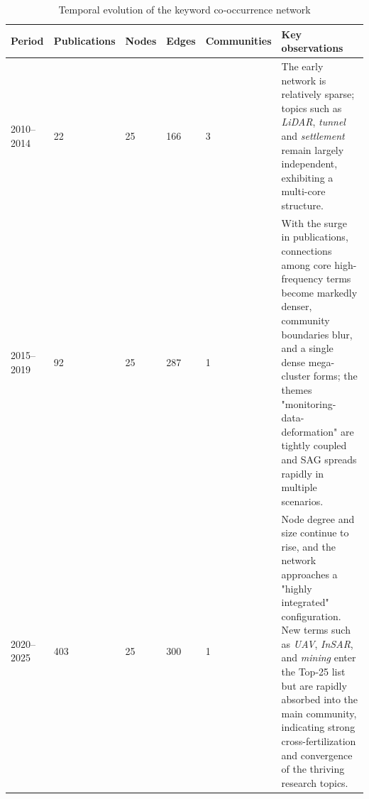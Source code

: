 \documentclass[preprint,11pt,authoryear,3p]{elsarticle}
\begin{document}
\begin{table}[htbp]
    \centering
    \caption{Temporal evolution of the keyword co‐occurrence network}
    \label{tab:Co_Nx}
    \begin{tabular}{p{4em}p{5em}p{4em}p{4em}p{4em}p{18em}}
        \toprule
        \textbf{Period} & \textbf{Publications} & \textbf{Nodes} & \textbf{Edges} & \textbf{Communities} & \textbf{Key observations} \\
        \midrule
        2010--2014 & 22  & 25 & 166 & 3 & The early network is relatively sparse; topics such as \textit{LiDAR}, \textit{tunnel} and \textit{settlement} remain largely independent, exhibiting a multi-core structure. \\
        
        2015--2019 & 92  & 25 & 287 & 1 & With the surge in publications, connections among core high-frequency terms become markedly denser, community boundaries blur, and a single dense mega-cluster forms; the themes "monitoring-data-deformation" are tightly coupled and SAG spreads rapidly in multiple scenarios. \\
        
        2020--2025 & 403 & 25 & 300 & 1 & Node degree and size continue to rise, and the network approaches a "highly integrated" configuration. New terms such as \textit{UAV}, \textit{InSAR}, and \textit{mining} enter the Top-25 list but are rapidly absorbed into the main community, indicating strong cross-fertilization and convergence of the thriving research topics. \\
        \bottomrule
    \end{tabular}
\end{table}
\end{document}
